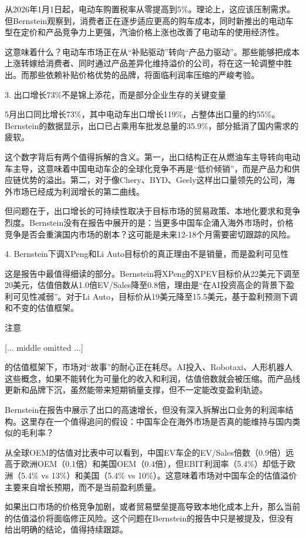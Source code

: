 \documentclass[11pt]{ctexart}
\begin{document}
从2026年1月1日起，电动车购置税率从零提高到5\%。理论上，这应该压制需求。但Bernstein观察到，消费者正在逐步适应更高的购车成本，同时新推出的电动车型在定价和产品竞争力上更强，汽油价格上涨也改善了电动车的使用经济性。

这意味着什么？电动车市场正在从“补贴驱动”转向“产品力驱动”。那些能够把成本上涨转嫁给消费者、同时通过产品差异化维持溢价的公司，将在这一轮调整中胜出。而那些依赖补贴价格优势的品牌，将面临利润率压缩的严峻考验。

3. 出口增长73\%不是锦上添花，而是部分企业生存的关键变量

5月出口同比增长73\%，其中电动车出口增长119\%，占整体出口量的约55\%。Bernstein的数据显示，出口已占乘用车批发总量的35.9\%，部分抵消了国内需求的疲软。

这个数字背后有两个值得拆解的含义。第一，出口结构正在从燃油车主导转向电动车主导，这意味着中国电动车企的全球化竞争不再是“低价倾销”，而是产品力和供应链优势的溢出。第二，对于像Chery、BYD、Geely这样出口量领先的公司，海外市场已经成为利润增长的第二曲线。

但问题在于，出口增长的可持续性取决于目标市场的贸易政策、本地化要求和竞争烈度。Bernstein没有在报告中展开的是：当更多中国车企涌入海外市场时，价格竞争是否会重演国内市场的剧本？这可能是未来12-18个月需要密切跟踪的风险。

4. Bernstein下调XPeng和Li Auto目标价的真正理由不是销量，而是盈利可见性

这是报告中最值得细读的部分。Bernstein将XPeng的XPEV目标价从22美元下调至20美元，估值倍数从1.0倍EV/Sales降至0.8倍，理由是“在AI投资高企的背景下盈利可见性减弱”。对于Li Auto，目标价从19美元降至15.5美元，基于盈利预测下调和不变的估值框架。

注意

[... middle omitted ...]

的估值框架下，市场对“故事”的耐心正在耗尽。AI投入、Robotaxi、人形机器人这些概念，如果不能转化为可量化的收入和利润，估值倍数就会被压缩。而产品线更新和品牌下沉，虽然能带来短期销量支撑，但不一定能改变盈利轨迹。

Bernstein在报告中展示了出口的高速增长，但没有深入拆解出口业务的利润率结构。这里存在一个值得追问的假设：中国车企在海外市场是否真的能维持与国内类似的毛利率？

从全球OEM的估值对比表中可以看到，中国EV车企的EV/Sales倍数（0.9倍）远高于欧洲OEM（0.1倍）和美国OEM（0.4倍），但EBIT利润率（5.4\%）却低于欧洲（5.4\% vs 13\%）和美国（5.4\% vs 10\%）。这意味着市场对中国车企的估值溢价主要来自增长预期，而不是当前盈利质量。

如果出口市场的价格竞争加剧，或者贸易壁垒提高导致本地化成本上升，那么当前的估值溢价将面临修正风险。这个问题在Bernstein的报告中只是被提及，但没有给出明确的结论，值得持续跟踪。
\end{document}
